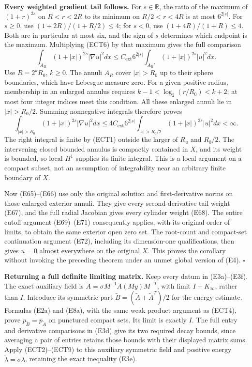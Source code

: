 \documentclass[
  11pt,
]{article}
\begin{document}
\textbf{Every weighted gradient tail follows.} For \(s\in\mathbb R\),
the ratio of the maximum of \((1+r)^{2s}\) on \(R<r<2R\) to its minimum
on \(R/2<r<4R\) is at most \(6^{2|s|}\). For \(s\geq0\), use
\((1+2R)/(1+R/2)\leq4\); for \(s<0\), use \((1+4R)/(1+R)\leq4\). Both
are in particular at most six, and the sign of \(s\) determines which
endpoint is the maximum. Multiplying (ECT6) by that maximum gives the
full comparison \[
 \int_{A_R}(1+|x|)^{2s}|\nabla u|^2dx
 \leq C_{\mathrm{ext}}6^{2|s|}
              \int_{A_R'}(1+|x|)^{2s}|u|^2dx.
 \tag{ECT8}
\] Use \(R=2^kR_0\), \(k\geq0\). The annuli \(A_R\) cover \(|x|>R_0\) up
to their sphere boundaries, which have Lebesgue measure zero. For a
given positive radius, membership in an enlarged annulus requires
\(k-1<\log_2(r/R_0)<k+2\); at most four integer indices meet this
condition. All these enlarged annuli lie in \(|x|>R_0/2\). Summing
nonnegative integrals therefore proves \[
 \int_{|x|>R_0}(1+|x|)^{2s}|\nabla u|^2dx
 \leq4C_{\mathrm{ext}}6^{2|s|}
             \int_{|x|>R_0/2}(1+|x|)^{2s}|u|^2dx<\infty.
 \tag{ECT9}
\] The right integral is finite by (ECT1) outside the larger of \(R_u\)
and \(R_0/2\). The intervening closed bounded annulus is compactly
contained in \(X\), and its weight is bounded, so local \(H^1\) supplies
its finite integral. This is a local argument on a compact subset, not
an assumption of integrability near an arbitrary finite boundary of
\(X\).

Now (E65)--(E66) use only the original solution and first-derivative
norms on those enlarged exterior annuli. They give every
second-derivative tail weight (E67), and the full radial Jacobian gives
every cylinder weight (E68). The entire cutoff argument (E69)--(E71)
consequently applies, with its original order of limits, to obtain the
same exterior open zero set. The root-count and compact-set continuation
argument (E72), including its dimension-one qualifications, then gives
\(u=0\) almost everywhere on the original \(X\). This proves the
corollary without invoking the preceding theorem under an unmet global
version of (E4). \(\square\)

\textbf{Returning a full definite limiting matrix.} Keep every datum in
(E3a)--(E3f). The exact auxiliary field is
\(\widetilde A=\sigma M^{-1}A(My)M^{-T}\), with limit \(I+K_\infty\),
rather than \(I\). Introduce its symmetric part
\(\widetilde B=(\widetilde A+\widetilde A^T)/2\) for the energy
estimate. Formulas (E2a) and (E8a), with the same weak product argument
as (ECT4), prove \(p_{\widetilde B}=p_{\widetilde A}\) on punctured
compact sets. Its limit is exactly \(I\). The full entry and derivative
comparisons in (E3d) give its two required decay bounds, since averaging
a pair of entries retains those bounds with their displayed matrix sums.
Apply (ECT2)--(ECT9) to this auxiliary symmetric field and positive
energy \(\widetilde\lambda=\sigma\lambda\), retaining the exact
inequality (E3e).
\end{document}
